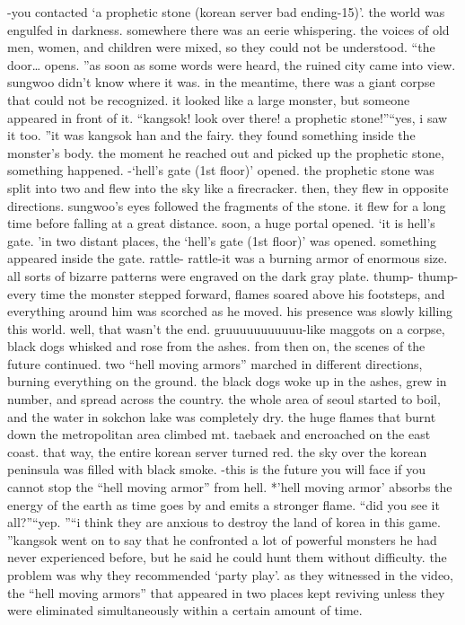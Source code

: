 -you contacted ‘a prophetic stone (korean server bad ending-15)’.
the world was engulfed in darkness.
 somewhere there was an eerie whispering.
 the voices of old men, women, and children were mixed, so they could not be understood.
“the door… opens.
”as soon as some words were heard, the ruined city came into view.
sungwoo didn’t know where it was.
 in the meantime, there was a giant corpse that could not be recognized.
 it looked like a large monster, but someone appeared in front of it.
“kangsok! look over there! a prophetic stone!”“yes, i saw it too.
”it was kangsok han and the fairy.
 they found something inside the monster’s body.
the moment he reached out and picked up the prophetic stone, something happened.
-‘hell’s gate (1st floor)’ opened.
the prophetic stone was split into two and flew into the sky like a firecracker.
 then, they flew in opposite directions.
sungwoo’s eyes followed the fragments of the stone.
 it flew for a long time before falling at a great distance.
 soon, a huge portal opened.
‘it is hell’s gate.
’in two distant places, the ‘hell’s gate (1st floor)’ was opened.
 something appeared inside the gate.
rattle- rattle-it was a burning armor of enormous size.
 all sorts of bizarre patterns were engraved on the dark gray plate.
thump- thump-every time the monster stepped forward, flames soared above his footsteps, and everything around him was scorched as he moved.
 his presence was slowly killing this world.
well, that wasn’t the end.
gruuuuuuuuuuu-like maggots on a corpse, black dogs whisked and rose from the ashes.
from then on, the scenes of the future continued.
 two “hell moving armors” marched in different directions, burning everything on the ground.
the black dogs woke up in the ashes, grew in number, and spread across the country.
the whole area of seoul started to boil, and the water in sokchon lake was completely dry.
the huge flames that burnt down the metropolitan area climbed mt.
 taebaek and encroached on the east coast.
that way, the entire korean server turned red.
 the sky over the korean peninsula was filled with black smoke.
-this is the future you will face if you cannot stop the “hell moving armor” from hell.
*’hell moving armor’ absorbs the energy of the earth as time goes by and emits a stronger flame.
“did you see it all?”“yep.
”“i think they are anxious to destroy the land of korea in this game.
”kangsok went on to say that he confronted a lot of powerful monsters he had never experienced before, but he said he could hunt them without difficulty.
the problem was why they recommended ‘party play’.
 as they witnessed in the video, the “hell moving armors” that appeared in two places kept reviving unless they were eliminated simultaneously within a certain amount of time.
